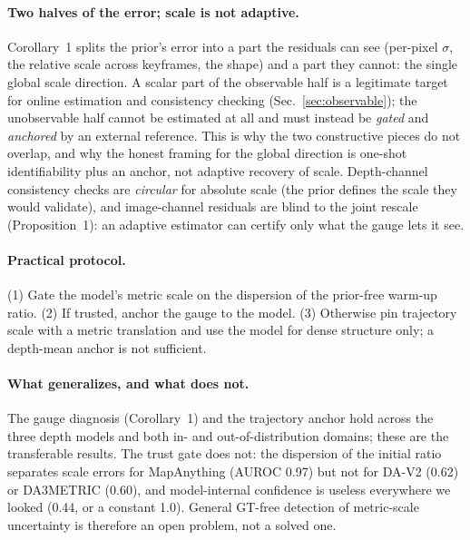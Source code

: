\paragraph{Two halves of the error; scale is not adaptive.} Corollary~1 splits
the prior's error into a part the residuals can see (per-pixel $\sigma$, the
relative scale across keyframes, the shape) and a part they cannot: the single
global scale direction. A scalar part of the observable half is a legitimate
target for online estimation and consistency checking (Sec.~\ref{sec:observable}); the unobservable
half cannot be estimated at
all and must instead be \emph{gated} and \emph{anchored} by an external reference.
This is why the two constructive pieces do not overlap, and why the honest framing
for the global direction is one-shot identifiability plus an anchor, not
adaptive recovery of scale. Depth-channel consistency checks are \emph{circular}
for absolute scale (the prior defines the scale they would validate), and
image-channel residuals are blind to the joint rescale (Proposition~1): an
adaptive estimator can certify only what the gauge lets it see.

\paragraph{Practical protocol.} (1) Gate the model's metric scale on the
dispersion of the prior-free warm-up ratio. (2) If trusted, anchor the gauge to
the model. (3) Otherwise pin trajectory scale with a metric translation and use
the model for dense structure only; a depth-mean anchor is not sufficient.

\paragraph{What generalizes, and what does not.} The gauge diagnosis
(Corollary~1) and the trajectory anchor hold across the three depth models and
both in- and out-of-distribution domains; these are the transferable results. The
trust gate does not: the dispersion of the initial ratio separates scale errors
for MapAnything (AUROC 0.97) but not for DA-V2 (0.62) or DA3METRIC (0.60), and
model-internal confidence is useless everywhere we looked (0.44, or a constant
1.0). General GT-free detection of metric-scale uncertainty is therefore an open
problem, not a solved one.

